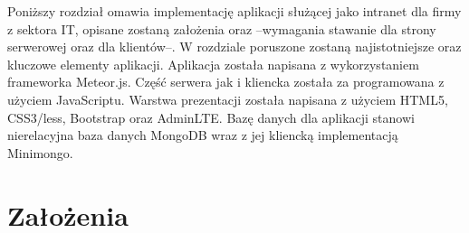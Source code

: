 Poniższy rozdział omawia implementację aplikacji służącej jako intranet dla firmy z sektora IT, opisane zostaną założenia oraz --wymagania stawanie dla strony serwerowej oraz dla klientów--. W rozdziale poruszone zostaną najistotniejsze oraz kluczowe elementy aplikacji. Aplikacja została napisana z wykorzystaniem frameworka Meteor.js. Część serwera jak i kliencka została za programowana z użyciem JavaScriptu. Warstwa prezentacji została napisana z użyciem HTML5, CSS3/less, Bootstrap oraz AdminLTE. Bazę danych dla aplikacji stanowi nierelacyjna baza danych MongoDB wraz z jej kliencką implementacją Minimongo.

\section{Założenia}

